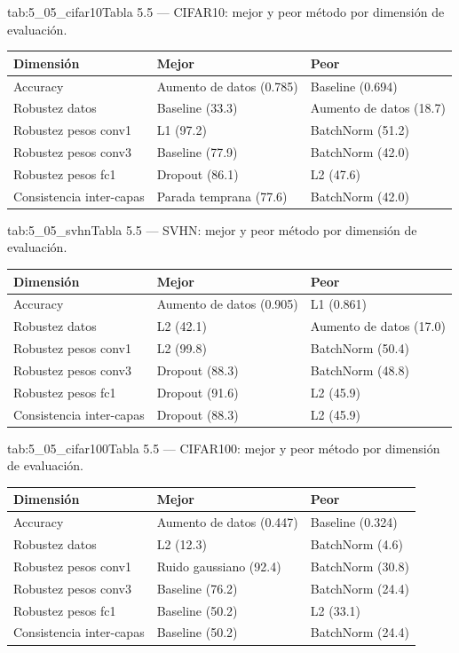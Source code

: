 \begin{table}{tab:5_05_cifar10}{Tabla 5.5 — CIFAR10: mejor y peor método por dimensión de evaluación.}
\small
\begin{tabular}{lll}
\toprule
\textbf{Dimensión} & \textbf{Mejor} & \textbf{Peor} \\
\midrule
Accuracy & Aumento de datos (0.785) & Baseline (0.694) \\
Robustez datos & Baseline (33.3) & Aumento de datos (18.7) \\
Robustez pesos conv1 & L1 (97.2) & BatchNorm (51.2) \\
Robustez pesos conv3 & Baseline (77.9) & BatchNorm (42.0) \\
Robustez pesos fc1 & Dropout (86.1) & L2 (47.6) \\
Consistencia inter-capas & Parada temprana (77.6) & BatchNorm (42.0) \\
\bottomrule
\end{tabular}
\end{table}

\begin{table}{tab:5_05_svhn}{Tabla 5.5 — SVHN: mejor y peor método por dimensión de evaluación.}
\small
\begin{tabular}{lll}
\toprule
\textbf{Dimensión} & \textbf{Mejor} & \textbf{Peor} \\
\midrule
Accuracy & Aumento de datos (0.905) & L1 (0.861) \\
Robustez datos & L2 (42.1) & Aumento de datos (17.0) \\
Robustez pesos conv1 & L2 (99.8) & BatchNorm (50.4) \\
Robustez pesos conv3 & Dropout (88.3) & BatchNorm (48.8) \\
Robustez pesos fc1 & Dropout (91.6) & L2 (45.9) \\
Consistencia inter-capas & Dropout (88.3) & L2 (45.9) \\
\bottomrule
\end{tabular}
\end{table}

\begin{table}{tab:5_05_cifar100}{Tabla 5.5 — CIFAR100: mejor y peor método por dimensión de evaluación.}
\small
\begin{tabular}{lll}
\toprule
\textbf{Dimensión} & \textbf{Mejor} & \textbf{Peor} \\
\midrule
Accuracy & Aumento de datos (0.447) & Baseline (0.324) \\
Robustez datos & L2 (12.3) & BatchNorm (4.6) \\
Robustez pesos conv1 & Ruido gaussiano (92.4) & BatchNorm (30.8) \\
Robustez pesos conv3 & Baseline (76.2) & BatchNorm (24.4) \\
Robustez pesos fc1 & Baseline (50.2) & L2 (33.1) \\
Consistencia inter-capas & Baseline (50.2) & BatchNorm (24.4) \\
\bottomrule
\end{tabular}
\end{table}

